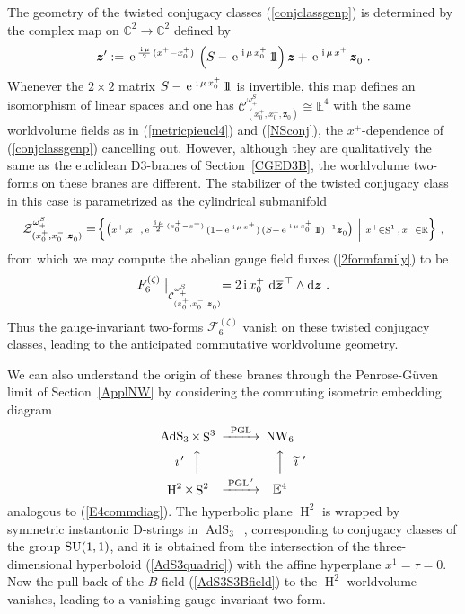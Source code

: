 \documentclass[11pt,a4paper]{article}
\DeclareMathOperator{\AdS}{AdS}
\DeclareMathOperator{\Sphere}{S}
\DeclareMathOperator{\NW}{NW}
\DeclareMathOperator{\Hyp}{H}
\let\S\Sphere
\newcommand{\ii}{{\rm i}}
\newcommand{\mbf}[1]{{\boldsymbol {#1} }}
\def\ii{{\,{\rm i}\,}}
\def\dd{{\rm d}}
\def\mz{{\mbf z}}
\newcommand{\complex}{{\mathbb C}} %
\newcommand{\real}{{\mathbb R}} %
\newcommand{\eucl}{{\mathbb E}}
\newcommand{\id}{{1\!\!1}} %
\def\e{{\,\rm e}\,}
\newcommand{\beq}{\begin{eqnarray}}
\newcommand{\eeq}{\end{eqnarray}}
\begin{document}
The geometry of the twisted conjugacy classes (\ref{conjclassgenp}) is
determined by the complex map on $\complex^2\to\complex^2$ defined by
\beq
\mz':=\e^{\frac{\ii\mu}2\,(x^+-x_0^+)}\,\left(S-\e^{\ii\mu\,x_0^+}\,\id
\right)\mz+\e^{\ii\mu\,x^+}\,\mz^{~}_0 \ .
\label{complexmapeucl}\eeq
Whenever the $2\times2$ matrix $S-\e^{\ii\mu\,x_0^+}\,\id$ is
invertible, this map defines an isomorphism of linear spaces and
one has
$\mathcal{C}^{\omega_+^S}_{(x_0^+,x^-_0,\mz^{~}_0)}\cong\eucl^4$ with
the same worldvolume fields as in (\ref{metricpieucl4}) and
(\ref{NSconj}), the $x^+$-dependence of (\ref{conjclassgenp})
cancelling out. However, although they are qualitatively the same as the
euclidean D3-branes of Section~\ref{CGED3B}, the worldvolume two-forms
on these branes are different. The stabilizer of the twisted conjugacy
class in this case is parametrized as the cylindrical submanifold
\beq
\mathcal{Z}^{\omega_+^S}_{(x_0^+,x^-_0,\mz^{~}_0)}=\scriptstyle{\left.\Bigl\{
\bigl(x^+,x^-,\e^{\frac{\ii\mu}2\,(x_0^+-x^+)}\,
(1-\e^{\ii\mu\,x^+})\,(S-\e^{\ii\mu\,x_0^+}\,
\id)^{-1}\mz^{~}_0\bigr)~\right|~x^+\in\S^1\,,\,x^-\in\real\Bigr\}} \ ,
\label{stabE4twist}\eeq
from which we may compute the abelian gauge field fluxes
(\ref{2formfamily}) to be
\beq
F^{(\zeta)}_6\bigm|_{\mathcal{C}^{\omega_+^S}_{(x_0^+,x^-_0,\mz^{~}_0)}}=
2\ii x_0^+~\dd\overline{\mz}{}^{\,\top}\wedge\dd\mz \ .
\label{E4F6twist}\eeq
Thus the gauge-invariant two-forms $\mathcal{F}_6^{(\zeta)}$ vanish on these
twisted conjugacy classes, leading to the anticipated commutative
worldvolume geometry.

We can also understand the origin of these
branes through the Penrose-G\"uven limit of Section~\ref{ApplNW} by
considering the commuting isometric embedding diagram
\begin{equation}
  \label{E4commdiagH2}
  \begin{CD}
    \AdS_3 \times \S^3             @>\text{PGL}>> \NW_6\\
    \text{$\imath^{\,\prime}~~$}@AAA
@AAA\text{$\widetilde{\imath}^{~\prime}$}\\
           \Hyp^2\times\S^2    @>\text{PGL$^{\,\prime}$}>> \eucl^4\\
  \end{CD}
\end{equation}
analogous to (\ref{E4commdiag}). The hyperbolic plane $\Hyp^2$ is
wrapped by symmetric instantonic D-strings in $\AdS_3$~\cite{Stanciu3},
corresponding to conjugacy classes of the group ${\rm SU}(1,1)$, and
it is obtained from the intersection of the three-dimensional hyperboloid
(\ref{AdS3quadric}) with the affine hyperplane $x^1=\tau=0$. Now the
pull-back of the $B$-field (\ref{AdS3S3Bfield}) to the $\Hyp^2$
worldvolume vanishes, leading to a vanishing gauge-invariant
two-form.
\end{document}
